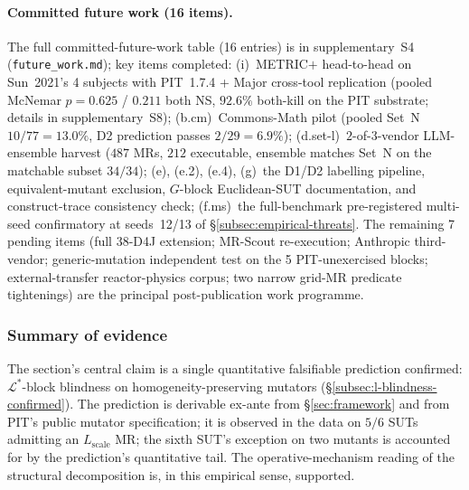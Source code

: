 \documentclass[manuscript]{acmart}
\begin{document}
\paragraph{Committed future work (16 items).}
\label{para:future-work}
The full committed-future-work table (16 entries) is in supplementary~S4 (\texttt{future\_work.md}); key items completed: (i)~METRIC$+$ head-to-head on Sun~2021's 4 subjects with PIT~1.7.4 + Major cross-tool replication (pooled McNemar $p = 0.625$ / $0.211$ both NS, $92.6\%$ both-kill on the PIT substrate; details in supplementary~S8); (b.cm)~Commons-Math pilot (pooled Set~N $10/77 = 13.0\%$, D2 prediction passes $2/29 = 6.9\%$); (d.set-l)~$2$-of-$3$-vendor LLM-ensemble harvest ($487$ MRs, $212$ executable, ensemble matches Set~N on the matchable subset $34/34$); (e), (e.2), (e.4), (g)~the D1/D2 labelling pipeline, equivalent-mutant exclusion, $G$-block Euclidean-SUT documentation, and construct-trace consistency check; (f.ms)~the full-benchmark pre-registered multi-seed confirmatory at seeds~12/13 of \S\ref{subsec:empirical-threats}. The remaining 7 pending items (full $38$-D4J extension; MR-Scout re-execution; Anthropic third-vendor; generic-mutation independent test on the 5 PIT-unexercised blocks; external-transfer reactor-physics corpus; two narrow grid-MR predicate tightenings) are the principal post-publication work programme.

\subsubsection{Summary of evidence}
\label{subsec:empirical-summary}

The section's central claim is a single quantitative falsifiable
prediction confirmed: $\mathcal{L}^{*}$-block blindness on
homogeneity-preserving mutators
(\S\ref{subsec:l-blindness-confirmed}). The prediction is derivable
ex-ante from \S\ref{sec:framework} and from PIT's public mutator
specification; it is observed in the data on $5/6$ SUTs admitting an
$L_{\mathrm{scale}}$ MR; the sixth SUT's exception on two mutants is
accounted for by the prediction's quantitative tail. The
operative-mechanism reading of the structural decomposition is, in
this empirical sense, supported.
\end{document}
